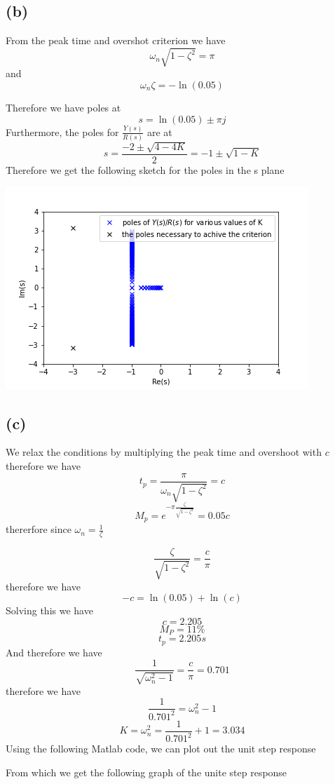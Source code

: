 \documentclass[12pt]{article}
\begin{document}
\subsection*{(b)}
From the peak time and overshot criterion we have
$$\omega_n\sqrt{1-\zeta^2}=\pi$$
and
$$\omega_n\zeta=-\ln(0.05)$$

Therefore we have poles at 
$$s=\ln(0.05)\pm \pi j$$
Furthermore, the poles for $\frac{Y(s)}{R(s)}$ are at 
$$s=\frac{-2\pm\sqrt{4-4K}}{2}=-1\pm\sqrt{1-K}$$
Therefore we get the following sketch for the poles in the s plane 

\includegraphics[scale=.5]{Problem3}
\FloatBarrier
\subsection*{(c)}
We relax the conditions by multiplying the peak time
and overshoot with $c$ therefore we have
$$t_p=\frac{\pi}{\omega_n\sqrt{1-\zeta^2}}=c$$
$$M_p=e^{-\pi\frac{\zeta}{\sqrt{1-\zeta^2}}}=0.05c$$
thererfore since $\omega_n=\frac{1}{\zeta}$

$$\frac{\zeta}{\sqrt{1-\zeta^2}}=\frac{c}{\pi}$$
therefore we have
$$-c=\ln(0.05)+\ln(c)$$
Solving this we have
$$c=2.205$$
$$M_P=11\%$$
$$t_p=2.205s$$
And therefore we have
$$\frac{1}{\sqrt{\omega_n^2-1}}=\frac{c}{\pi}=0.701$$
therefore we have
$$\frac{1}{0.701^2}=\omega_n^2-1$$
$$K=\omega_n^2=\frac{1}{0.701^2}+1=3.034$$
Using the following Matlab code, we can plot out the unit step response


From which we get the following graph of the unite step response
\end{document}
